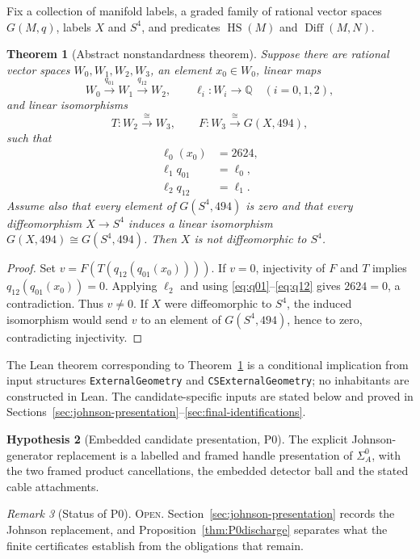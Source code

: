 \documentclass[11pt]{amsart}
\newtheorem{theorem}{Theorem}[section]
\theoremstyle{definition}
\newtheorem{hypothesis}[theorem]{Hypothesis}
\theoremstyle{remark}
\newtheorem{remark}[theorem]{Remark}
\newcommand{\Q}{\mathbb{Q}}
\newcommand{\Open}{\textnormal{\textsc{Open}}}
\begin{document}
Fix a collection of manifold labels, a graded family of rational vector
spaces $G(M,q)$, labels $X$ and $S^4$, and predicates
\(\operatorname{HS}(M)\) and \(\operatorname{Diff}(M,N)\).

\begin{theorem}[Abstract nonstandardness theorem]\label{thm:A}
Suppose there are rational vector spaces $W_0,W_1,W_2,W_3$, an element
$x_0\in W_0$, linear maps
\[
W_0\xrightarrow{q_{01}}W_1\xrightarrow{q_{12}}W_2,
\qquad
\ell_i:W_i\longrightarrow\Q\quad (i=0,1,2),
\]
and linear isomorphisms
\[
T:W_2\xrightarrow{\cong}W_3,
\qquad
F:W_3\xrightarrow{\cong}G(X,494),
\]
such that
\begin{align}
\ell_0(x_0)&=2624,\label{eq:value}\\
\ell_1q_{01}&=\ell_0,\label{eq:q01}\\
\ell_2q_{12}&=\ell_1.\label{eq:q12}
\end{align}
Assume also that every element of $G(S^4,494)$ is zero and that every
diffeomorphism $X\to S^4$ induces a linear isomorphism
\(G(X,494)\cong G(S^4,494)\).  Then $X$ is not diffeomorphic to $S^4$.
\end{theorem}

\begin{proof}
Set $v=F(T(q_{12}(q_{01}(x_0))))$.  If $v=0$, injectivity of $F$ and $T$
implies $q_{12}(q_{01}(x_0))=0$.  Applying $\ell_2$ and using
\eqref{eq:q01}--\eqref{eq:q12} gives $2624=0$, a contradiction.  Thus
$v\ne0$.  If $X$ were diffeomorphic to $S^4$, the induced isomorphism would
send $v$ to an element of $G(S^4,494)$, hence to zero, contradicting
injectivity.
\end{proof}

The Lean theorem corresponding to Theorem~\ref{thm:A} is a conditional
implication from input structures \texttt{ExternalGeometry} and
\texttt{CSExternalGeometry}; no inhabitants are constructed in Lean.
The candidate-specific inputs are stated below and proved in
Sections~\ref{sec:johnson-presentation}--\ref{sec:final-identifications}.

\begin{hypothesis}[Embedded candidate presentation, P0]\label{hyp:P0}
The explicit Johnson-generator replacement is a labelled and framed handle
presentation of $\Sigma_A^0$, with the two framed product cancellations, the
embedded detector ball and the stated cable attachments.
\end{hypothesis}

\begin{remark}[Status of P0]
\Open.  Section~\ref{sec:johnson-presentation} records the Johnson
replacement, and Proposition~\ref{thm:P0discharge} separates what the
finite certificates establish from the obligations that remain.
\end{remark}
\end{document}
